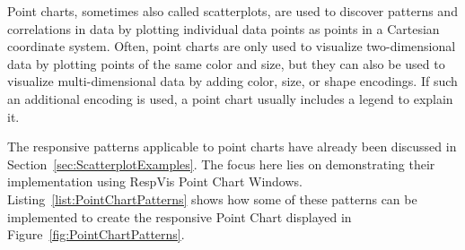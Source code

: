 Point charts, sometimes also called scatterplots, are used to discover
patterns and correlations in data by plotting individual data points
as points in a Cartesian coordinate system. Often, point charts are
only used to visualize two-dimensional data by plotting points of the
same color and size, but they can also be used to visualize
multi-dimensional data by adding color, size, or shape encodings. If
such an additional encoding is used, a point chart usually includes a
legend to explain it.

The responsive patterns applicable to point charts have already been
discussed in Section~\ref{sec:ScatterplotExamples}. The focus here
lies on demonstrating their implementation using RespVis Point Chart
Windows. Listing~\ref{list:PointChartPatterns} shows how some of
these patterns can be implemented to create the responsive Point Chart
displayed in Figure~\ref{fig:PointChartPatterns}.


